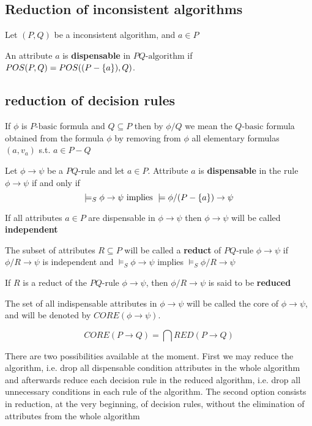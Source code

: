 \documentclass[11pt]{article}
\begin{document}
\subsection{Reduction of inconsistent algorithms}
\label{sec:org3b57e0d}
Let \((P,Q)\) be a inconsistent algorithm, and \(a\in P\)

An attribute \(a\) is \textbf{dispensable} in \(PQ\text{-algorithm}\) if
\(POS(P,Q)=POS((P-\left\{ a\right\}),Q)\).
\subsection{reduction of decision rules}
\label{sec:orgf2ae4f3}
If \(\phi\) is \(P\text{-basic}\) formula and \(Q\subseteq P\) then by \(\phi/Q\) we
mean the \(Q\text{-basic}\) formula obtained from the formula \(\phi\) by removing
from \(\phi\) all elementary formulas \((a,v_a)\) s.t. \(a\in P-Q\)

Let \(\phi\to\psi\) be a \(PQ\text{-rule}\) and let \(a\in P\). Attribute \(a\) is
\textbf{dispensable} in the rule \(\phi\to\psi\) if and only if
\begin{equation*}
\models_S\phi\to\psi \text{ implies } \models \phi/(P-\left\{ a \right\})\to \psi
\end{equation*}

If all attributes \(a\in P\) are dispensable in \(\phi\to\psi\) then \(\phi\to\psi\)
will be called \textbf{independent}

The subset of attributes \(R\subseteq P\) will be called a \textbf{reduct} of
\(PQ\text{-rule}\) \(\phi\to\psi\) if \(\phi/R\to\psi\) is independent and
\(\models_S\phi\to\psi\) implies \(\models_S\phi/R\to\psi\)

If \(R\) is a reduct of the \(PQ\text{-rule}\) \(\phi\to\psi\), then \(\phi/R\to\psi\)
is said to be \textbf{reduced}

The set of all indispensable attributes in \(\phi\to\psi\) will be called the
core of \(\phi\to\psi\), and will be denoted by \(CORE(\phi\to\psi)\).

\begin{proposition}[7.8]
\begin{equation*}
CORE(P\to Q)=\bigcap RED(P\to Q)
\end{equation*}
\end{proposition}

There are two possibilities available at the moment. First we may reduce the
algorithm, i.e. drop all dispensable condition attributes in the whole algorithm 
and afterwards reduce each decision rule in the reduced algorithm, i.e. drop all
unnecessary conditions in each rule of the algorithm. The second option consists
in reduction, at the very beginning, of decision rules, without the
elimination of attributes from the whole algorithm
\end{document}
